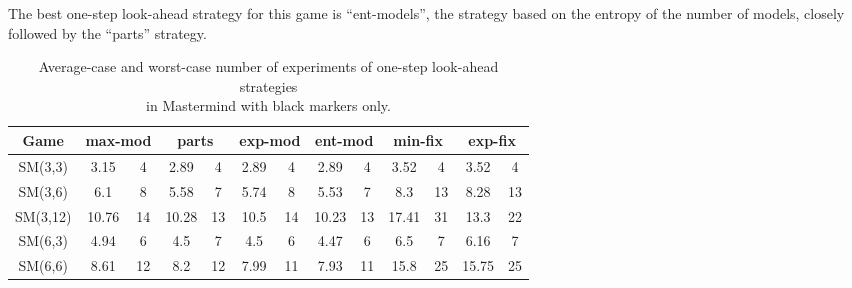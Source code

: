 The best one-step look-ahead strategy for this game is ``ent-models'',
  the strategy based on the entropy of the number of models,
  closely followed by the ``parts'' strategy.

\begin{table}[ht]
\begin{center}
\begin{small}
\begin{tabular}{|c|c|c|c|c|c|c|c|c|c|c|c|c|}\hline
Game & \multicolumn{2}{c|}{max-mod} & \multicolumn{2}{c|}{parts}
& \multicolumn{2}{c|}{exp-mod} & \multicolumn{2}{c|}{ent-mod}
& \multicolumn{2}{c|}{min-fix} & \multicolumn{2}{c|}{exp-fix}\\ \hline
SM(3,3) & 3.15 &  4 &  2.89 & 4 & 2.89 & 4 & 2.89 & 4 & 3.52 &  4 & 3.52 &  4 \\
SM(3,6) & 6.1 &  8 &  5.58 & 7 & 5.74 & 8 & 5.53 & 7 & 8.3 & 13 &  8.28 &  13 \\
SM(3,12)& 10.76& 14 & 10.28 & 13& 10.5 & 14 & 10.23 & 13 &  17.41 & 31 &  13.3 &  22 \\ \hline
SM(6,3)& 4.94 &  6 &  4.5 & 7 & 4.5 & 6 & 4.47 &  6 & 6.5 & 7 & 6.16 &  7 \\
SM(6,6)& 8.61 & 12 &  8.2 & 12& 7.99 & 11 & 7.93 & 11 &  15.8 &  25 &  15.75 & 25 \\ \hline
\end{tabular}
\end{small}
\caption{Average-case and worst-case number of experiments
  of one-step look-ahead strategies \\ in Mastermind with black markers only.}
\label{tbl:exp-mmb}
\end{center}
\end{table}


